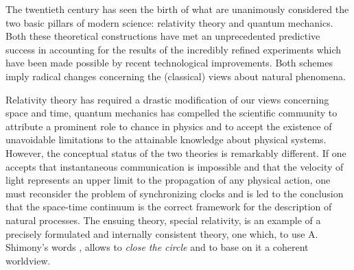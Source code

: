 \documentclass[12pt]{article}
\begin{document}
The twentieth century has seen the birth of what are unanimously
considered the two basic pillars of modern science: relativity
theory and quantum mechanics. Both these theoretical constructions
have met an unprecedented predictive success in accounting for the
results of  the incredibly refined experiments which have been
made possible by recent technological improvements. Both schemes
imply radical changes concerning the (classical) views about
natural phenomena.

Relativity theory has required a drastic modification of our views
concerning space and time, quantum mechanics has compelled the
scientific community to attribute a prominent role to chance in
physics and to accept the existence of unavoidable limitations to
the attainable knowledge about physical systems. However, the
conceptual status of the two theories is remarkably different. If
one accepts that instantaneous communication is impossible and
that the velocity of light represents an upper limit to the
propagation of any physical action, one must reconsider the
problem of synchronizing clocks and is led to the conclusion that
the space-time continuum is the correct framework for the
description of natural processes. The ensuing theory, special
relativity, is an example of a precisely formulated and internally
consistent theory, one which, to use A. Shimony's words
\cite{shipcqf}, allows to {\it close the circle} and to base on it
a coherent worldview.
\end{document}
